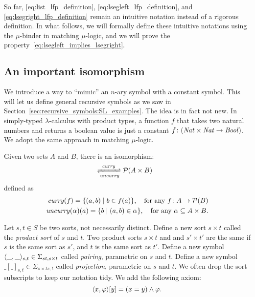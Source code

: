 \documentclass{amsart}
\begin{document}
So far, \eqref{eq:list_lfp_definition}, \eqref{eq:lsegleft_lfp_definition},
and \eqref{eq:lsegright_lfp_definition} remain an intuitive notation
instead of a rigorous definition.
In what follows, we will formally define these intuitive notations
using the $\mu$-binder in matching $\mu$-logic,
and we will prove the property~\eqref{eq:lsegleft_implies_lsegright}.


\subsection{An important isomorphism}

We introduce a way to ``mimic'' an $n$-ary symbol
with a constant symbol.
This will let us define general recursive symbols
as we saw in Section~\ref{sec:recursive_symbols:SL_examples}.
The idea is in fact not new.
In simply-typed $\lambda$-calculus with product types,
a function $f$ that takes two natural numbers and returns
a boolean value is just a constant $f \colon (\mathit{Nat} \times \mathit{Nat} \to \mathit{Bool})$.
We adopt the same approach in matching $\mu$-logic.

\begin{proposition}
Given two sets $A$ and $B$,
there is an isomorphism:
\begin{align}
[A \to \pset{B}] & \xrightleftharpoons[\uncurry]{\curry} \pset{A \times B}
\end{align}
defined as
\begin{align}
\mathit{curry}(f) = \{ (a,b) \mid b \in f(a) \},
\quad \text{for any $f \colon A \to \mathcal{P}(B)$} \\
\mathit{uncurry}(\alpha)(a) = \{ b \mid (a,b) \in \alpha \},
\quad \text{for any $\alpha \subseteq A \times B$.}
\end{align}
\end{proposition}




\begin{definition}
Let $s, t \in S$ be two sorts, not necessarily distinct.
Define a new sort $s \times t$ called the \emph{product sort}
of $s$ and $t$.
Two product sorts $s \times t$ and
and $s' \times t'$ are the same if
$s$ is the same sort as $s'$, and $t$ is the same sort as  $t'$.
Define a new symbol $\langle\_,\_\rangle_{s,t} \in \Sigma_{s t , s \times t}$
called \emph{pairing}, parametric on $s$ and $t$.
Define a new symbol $\_[\_]_{s,t} \in \Sigma_{s \times t s , t}$
called \emph{projection}, parametric on $s$ and $t$.
We often drop the sort subscripts to keep our notation tidy.
We add the following axiom:
\begin{equation}
\label{eq:key_value}
\langle x,\varphi \rangle [y] = (x=y) \wedge \varphi.
\end{equation}
\end{definition}
\end{document}

